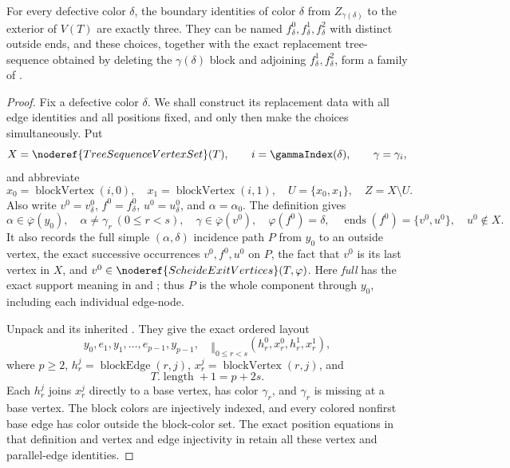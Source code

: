 \begin{lemma}
For every defective color $\delta$, the boundary identities of color
$\delta$ from $Z_{\gamma(\delta)}$ to the exterior of $V(T)$ are exactly
three.  They can be named $f^0_\delta,f^1_\delta,f^2_\delta$ with distinct
outside ends, and these choices, together with the exact replacement
tree-sequence obtained by deleting the $\gamma(\delta)$ block and adjoining
$f^1_\delta,f^2_\delta$, form a family of
.
\end{lemma}
\begin{proof}
Fix a defective color $\delta$.  We shall construct its replacement data
with all edge identities and all positions fixed, and only then make the
choices simultaneously.  Put
\[
 X=\noderef{TreeSequenceVertexSet}(T),\qquad
 i=\gammaIndex(\delta),\qquad \gamma=\gamma_i,
\]
and abbreviate
\[
 x_0=\operatorname{blockVertex}(i,0),\quad
 x_1=\operatorname{blockVertex}(i,1),\quad
 U=\{x_0,x_1\},\quad Z=X\setminus U.                         \tag{1}
\]
Also write $v^0=v^0_\delta$, $f^0=f^0_\delta$,
$u^0=u^0_\delta$, and $\alpha=\alpha_0$.  The definition
 gives
\[
 \alpha\in\overline\varphi(y_0),\quad
 \alpha\ne\gamma_r\ (0\le r<s),\quad
 \gamma\in\overline\varphi(v^0),\quad
 \varphi(f^0)=\delta,\quad
 \operatorname{ends}(f^0)=\{v^0,u^0\},\quad u^0\notin X.       \tag{2}
\]
It also records the full simple $(\alpha,\delta)$ incidence path $P$
from $y_0$ to an outside vertex, the exact successive occurrences
$v^0,f^0,u^0$ on $P$, the fact that $v^0$ is its last vertex in $X$,
and $v^0\in\noderef{ScheideExitVertices}(T,\varphi)$.
Here \emph{full} has the exact support meaning in
 and
; thus $P$ is the whole component through
$y_0$, including each individual edge-node.

Unpack  and its inherited
.  They give the exact ordered
layout
\[
 y_0,e_1,y_1,\ldots,e_{p-1},y_{p-1},
 \quad
 \mathop{\Vert}_{0\le r<s}
   (h^0_r,x^0_r,h^1_r,x^1_r),                                \tag{3}
\]
where $p\ge2$, $h^j_r=\operatorname{blockEdge}(r,j)$,
$x^j_r=\operatorname{blockVertex}(r,j)$, and
\[
 T.\operatorname{length}+1=p+2s.                             \tag{4}
\]
Each $h^j_r$ joins $x^j_r$ directly to a base vertex, has color
$\gamma_r$, and $\gamma_r$ is missing at a base vertex.  The block
colors are injectively indexed, and every colored nonfirst base edge has
color outside the block-color set.  The exact position equations in that
definition and vertex and edge injectivity in
 retain all these vertex and parallel-edge
identities.


\end{proof}

